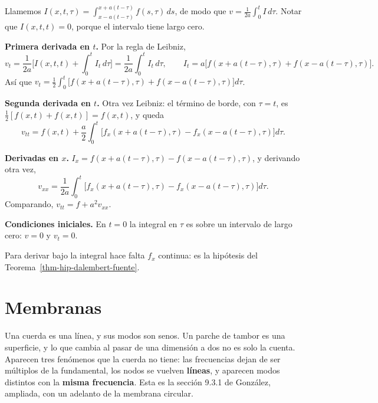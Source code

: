 \documentclass[
  spanish,
  a4paper,
]{scrbook}
\theoremstyle{definition}
\theoremstyle{plain}
\theoremstyle{definition}
\theoremstyle{plain}
\theoremstyle{definition}
\theoremstyle{remark}
\begin{document}
\begin{tcolorbox}[enhanced jigsaw, arc=.35mm, bottomrule=.15mm, bottomtitle=1mm, breakable, colback=white, colbacktitle=quarto-callout-tip-color!10!white, colframe=quarto-callout-tip-color-frame, coltitle=black, left=2mm, leftrule=.75mm, opacityback=0, opacitybacktitle=0.6, rightrule=.15mm, title=\textcolor{quarto-callout-tip-color}{\faLightbulb}\hspace{0.5em}{Solución}, titlerule=0mm, toprule=.15mm, toptitle=1mm]

Llamemos
\(I(x,t,\tau) = \int_{x-a(t-\tau)}^{x+a(t-\tau)} f(s,\tau)\,ds\), de
modo que \(v = \frac{1}{2a}\int_0^t I\,d\tau\). Notar que
\(I(x,t,t) = 0\), porque el intervalo tiene largo cero.

\textbf{Primera derivada en \(t\).} Por la regla de Leibniz, \[
v_t = \frac{1}{2a}\Big[I(x,t,t) + \int_0^t I_t\,d\tau\Big] = \frac{1}{2a}\int_0^t I_t\,d\tau,
\qquad I_t = a\big[f(x+a(t-\tau),\tau) + f(x-a(t-\tau),\tau)\big].
\] Así que
\(v_t = \tfrac12\int_0^t\big[f(x+a(t-\tau),\tau) + f(x-a(t-\tau),\tau)\big]d\tau\).

\textbf{Segunda derivada en \(t\).} Otra vez Leibniz: el término de
borde, con \(\tau = t\), es \(\tfrac12[f(x,t)+f(x,t)] = f(x,t)\), y
queda \[
v_{tt} = f(x,t) + \frac a2\int_0^t\big[f_x(x+a(t-\tau),\tau) - f_x(x-a(t-\tau),\tau)\big]d\tau .
\]

\textbf{Derivadas en \(x\).}
\(I_x = f(x+a(t-\tau),\tau) - f(x-a(t-\tau),\tau)\), y derivando otra
vez, \[
v_{xx} = \frac{1}{2a}\int_0^t\big[f_x(x+a(t-\tau),\tau) - f_x(x-a(t-\tau),\tau)\big]d\tau .
\] Comparando, \(v_{tt} = f + a^2v_{xx}\).

\textbf{Condiciones iniciales.} En \(t = 0\) la integral en \(\tau\) es
sobre un intervalo de largo cero: \(v = 0\) y \(v_t = 0\).

Para derivar bajo la integral hace falta \(f_x\) continua: es la
hipótesis del Teorema~\ref{thm-hip-dalembert-fuente}.

\end{tcolorbox}

\section{Membranas}\label{sec-hip-membranas}

Una cuerda es una línea, y sus modos son senos. Un parche de tambor es
una superficie, y lo que cambia al pasar de una dimensión a dos no es
solo la cuenta. Aparecen tres fenómenos que la cuerda no tiene: las
frecuencias dejan de ser múltiplos de la fundamental, los nodos se
vuelven \textbf{líneas}, y aparecen modos distintos con la \textbf{misma
frecuencia}. Esta es la sección 9.3.1 de González, ampliada, con un
adelanto de la membrana circular.
\end{document}
